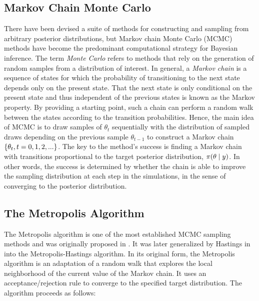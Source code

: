 \subsection{Markov Chain Monte Carlo}

There have been devised a suite of methods for constructing and sampling from arbitrary posterior distributions, but Markov chain Monte Carlo (MCMC) methods have become the predominant computational strategy for Bayesian inference. The term \textit{Monte Carlo} refers to methods that rely on the generation of random samples from a distribution of interest. In general, a \textit{Markov chain} is a sequence of states for which the probability of transitioning to the next state depends only on the present state. That the next state is only conditional on the present state and thus independent of the previous states is known as the Markov property. By providing a starting point, such a chain can perform a random walk between the states according to the transition probabilities. Hence, the main idea of MCMC is to draw samples of $\theta_t$ sequentially with the distribution of sampled draws depending on the previous sample $\theta_{t-1}$ to construct a Markov chain $\qty{\theta_t, t=0,1,2,...}$. The key to the method's success is finding a Markov chain with transitions proportional to the target posterior distribution, $\pi \qty(\theta \mid y)$. In other words, the success is determined by whether the chain is able to improve the sampling distribution at each step in the simulations, in the sense of converging to the posterior distribution. 


\subsection{The Metropolis Algorithm}

The Metropolis algorithm is one of the most established MCMC sampling methods and was originally proposed in \cite{Metropolis}. It was later generalized by Hastings in \cite{Hastings} into the Metropolis-Hastings algorithm. In its original form, the Metropolis algorithm is an adaptation of a random walk that explores the local neighborhood of the current value of the Markov chain. It uses an acceptance/rejection rule to converge to the specified target distribution. The algorithm proceeds as follows:

